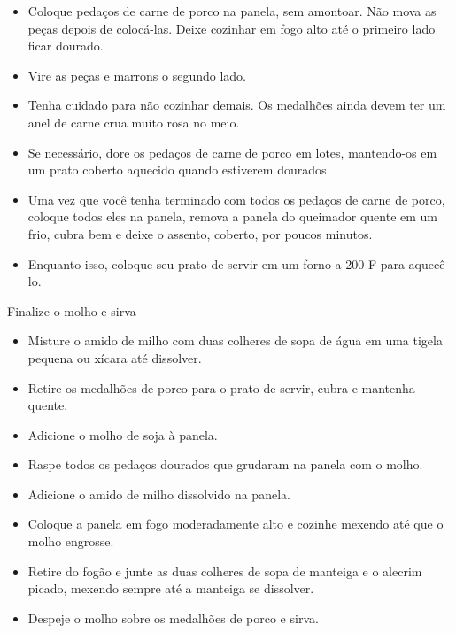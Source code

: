 \documentclass [11pt, papel de carta] {article}
\begin{document}
\begin {description}
\begin {description}
\begin {itemize}
\item Coloque pedaços de carne de porco na panela, sem amontoar. Não mova as peças depois de colocá-las. Deixe cozinhar em fogo alto até o primeiro lado ficar dourado.
\item Vire as peças e marrons o segundo lado.
\item Tenha cuidado para não cozinhar demais. Os medalhões ainda devem ter um anel de carne crua muito rosa no meio.
\item Se necessário, dore os pedaços de carne de porco em lotes, mantendo-os em um prato coberto aquecido quando estiverem dourados.
\item Uma vez que você tenha terminado com todos os pedaços de carne de porco, coloque todos eles na panela, remova a panela do queimador quente em um frio, cubra bem e deixe o assento, coberto, por poucos minutos.
\item Enquanto isso, coloque seu prato de servir em um forno a 200 F para aquecê-lo.
\end {itemize}
\item [Finalize o molho e sirva] \ \\
\begin {itemize}
\item Misture o amido de milho com duas colheres de sopa de água em uma tigela pequena ou xícara até dissolver.
\item Retire os medalhões de porco para o prato de servir, cubra e mantenha quente.
\item Adicione o molho de soja à panela.
\item Raspe todos os pedaços dourados que grudaram na panela com o molho.
\item Adicione o amido de milho dissolvido na panela.
\item Coloque a panela em fogo moderadamente alto e cozinhe mexendo até que o molho engrosse.
\item Retire do fogão e junte as duas colheres de sopa de manteiga e o alecrim picado, mexendo sempre até a manteiga se dissolver.
\item Despeje o molho sobre os medalhões de porco e sirva.
\end {itemize}
\end {description}
\end {description}
\end{document}
